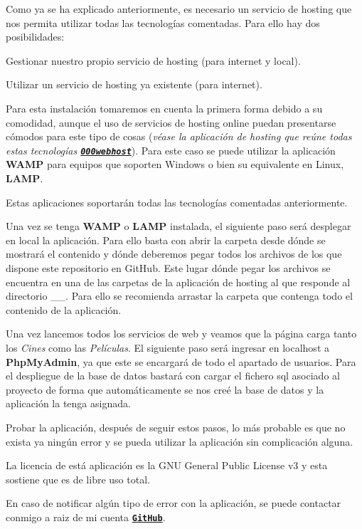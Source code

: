 \begin{DoxyEnumerate}
\item Como ya se ha explicado anteriormente, es necesario un servicio de hosting que nos permita utilizar todas las tecnologías comentadas. Para ello hay dos posibilidades\+:
\begin{DoxyItemize}
\item Gestionar nuestro propio servicio de hosting (para internet y local).
\item Utilizar un servicio de hosting ya existente (para internet).
\end{DoxyItemize}

Para esta instalación tomaremos en cuenta la primera forma debido a su comodidad, aunque el uso de servicios de hosting online puedan presentarse cómodos para este tipo de cosas ({\itshape véase la aplicación de hosting que reúne todas estas tecnologías \href{https://www.000webhost.com/}{\texttt{ {\bfseries{000webhost}}}}}). Para este caso se puede utilizar la aplicación {\bfseries{W\+A\+MP}} para equipos que soporten Windows o bien su equivalente en Linux, {\bfseries{L\+A\+MP}}.

Estas aplicaciones soportarán todas las tecnologías comentadas anteriormente.
\item Una vez se tenga {\bfseries{W\+A\+MP}} o {\bfseries{L\+A\+MP}} instalada, el siguiente paso será desplegar en local la aplicación. Para ello basta con abrir la carpeta desde dónde se mostrará el contenido y dónde deberemos pegar todos los archivos de los que dispone este repositorio en Git\+Hub. Este lugar dónde pegar los archivos se encuentra en una de las carpetas de la aplicación de hosting al que responde al directorio \+\_\+\_\+. Para ello se recomienda arrastar la carpeta que contenga todo el contenido de la aplicación.
\item Una vez lancemos todos los servicios de web y veamos que la página carga tanto los {\itshape Cines} como las {\itshape Películas}. El siguiente paso será ingresar en {\ttfamily localhost} a {\bfseries{Php\+My\+Admin}}, ya que este se encargará de todo el apartado de usuarios. Para el despliegue de la base de datos bastará con cargar el fichero sql asociado al proyecto de forma que automáticamente se nos creé la base de datos y la aplicación la tenga asignada.
\item Probar la aplicación, después de seguir estos pasos, lo más probable es que no exista ya ningún error y se pueda utilizar la aplicación sin complicación alguna.
\end{DoxyEnumerate}

La licencia de está aplicación es la G\+NU General Public License v3 y esta sostiene que es de libre uso total.



En caso de notificar algún tipo de error con la aplicación, se puede contactar conmigo a raiz de mi cuenta \href{https://github.com/FosterGun}{\texttt{ {\bfseries{Git\+Hub}}}}. 